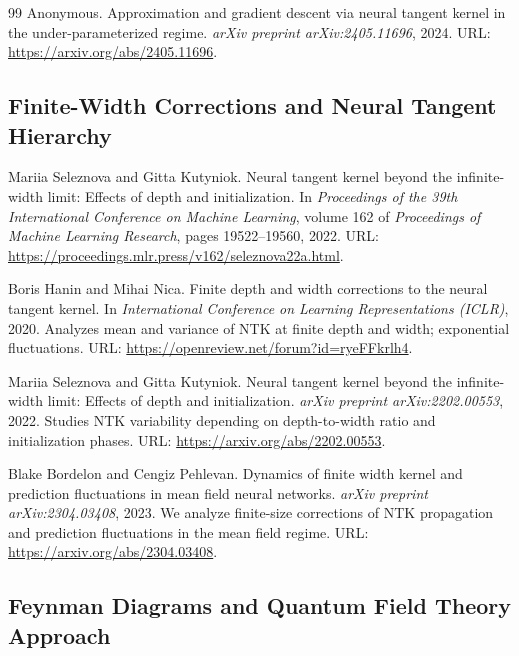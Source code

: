 \documentclass[a4paper]{article}
\theoremstyle{plain}
\theoremstyle{definition}
\theoremstyle{remark}
\begin{document}
\begin{thebibliography}{99}
\label{ref:ntk2024underparam}
Anonymous.
Approximation and gradient descent via neural tangent kernel in the under-parameterized regime.
\textit{arXiv preprint arXiv:2405.11696}, 2024.
URL: \href{https://arxiv.org/abs/2405.11696}{\url{https://arxiv.org/abs/2405.11696}}.

\subsection*{Finite-Width Corrections and Neural Tangent Hierarchy}

\label{ref:seleznova2022ntk_beyond}
Mariia Seleznova and Gitta Kutyniok.
Neural tangent kernel beyond the infinite-width limit: Effects of depth and initialization.
In \textit{Proceedings of the 39th International Conference on Machine Learning},
volume 162 of \textit{Proceedings of Machine Learning Research}, pages 19522--19560, 2022.
URL: \url{https://proceedings.mlr.press/v162/seleznova22a.html}.

\label{ref:hanin_nica_2019}
Boris Hanin and Mihai Nica.
Finite depth and width corrections to the neural tangent kernel.
In \textit{International Conference on Learning Representations (ICLR)}, 2020.
Analyzes mean and variance of NTK at finite depth and width; exponential fluctuations.
URL: \url{https://openreview.net/forum?id=ryeFFkrlh4}.

\label{ref:seleznova_kutyniok_2022}
Mariia Seleznova and Gitta Kutyniok.
Neural tangent kernel beyond the infinite-width limit: Effects of depth and initialization.
\textit{arXiv preprint arXiv:2202.00553}, 2022.
Studies NTK variability depending on depth-to-width ratio and initialization phases.
URL: \href{https://arxiv.org/abs/2202.00553}{\url{https://arxiv.org/abs/2202.00553}}.

\label{ref:bordelon2023dynamicsfinitewidthkernel}
Blake Bordelon and Cengiz Pehlevan.
Dynamics of finite width kernel and prediction fluctuations in mean field neural networks.
\textit{arXiv preprint arXiv:2304.03408}, 2023.
We analyze finite-size corrections of NTK propagation and prediction fluctuations in the mean field regime. %
URL: \href{https://arxiv.org/abs/2304.03408}{\url{https://arxiv.org/abs/2304.03408}}.

\subsection*{Feynman Diagrams and Quantum Field Theory Approach}


\end{thebibliography}
\end{document}
